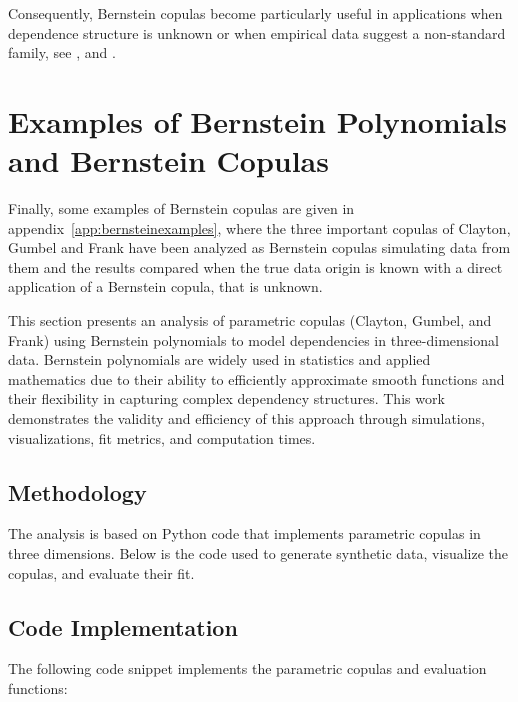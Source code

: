 \documentclass[
	11pt, %
	fleqn, %
	a4paper, %
]{LegrandOrangeBook}
\begin{document}
Consequently, Bernstein copulas become particularly useful in applications when dependence structure is unknown or when empirical data suggest a non-standard family, see \cite{Lorentz1986}, \cite{sancetta2004} and \cite{Janssen2013}.

\section{Examples of Bernstein Polynomials and Bernstein Copulas}
\label{app:bernsteinexamples}
Finally, some examples of Bernstein copulas are given in appendix~\ref{app:bernsteinexamples}, where the three important copulas of Clayton, Gumbel and Frank have been analyzed as Bernstein copulas simulating data from them and the results compared when the true data origin is known with a direct application of a Bernstein copula, that is unknown.

This section presents an analysis of parametric copulas (Clayton, Gumbel, and Frank) using Bernstein polynomials to model dependencies in three-dimensional data. Bernstein polynomials are widely used in statistics and applied mathematics due to their ability to efficiently approximate smooth functions and their flexibility in capturing complex dependency structures. This work demonstrates the validity and efficiency of this approach through simulations, visualizations, fit metrics, and computation times.

\subsection{Methodology}
The analysis is based on Python code that implements parametric copulas in three dimensions. Below is the code used to generate synthetic data, visualize the copulas, and evaluate their fit.

\subsection{Code Implementation}
The following code snippet implements the parametric copulas and evaluation functions:

\end{document}
